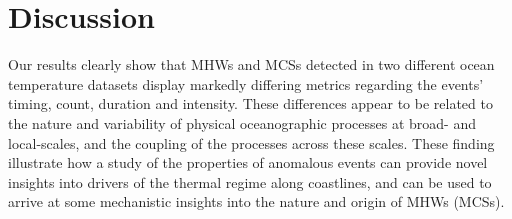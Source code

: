 \documentclass[a4paper,10pt,review]{elsarticle}
\begin{document}
\section{Discussion}
Our results clearly show that MHWs and MCSs detected in two different ocean temperature datasets display markedly differing metrics regarding the events' timing, count, duration and intensity. These differences appear to be related to the nature and variability of physical oceanographic processes at broad- and local-scales, and the coupling of the processes across these scales. These finding illustrate how a study of the properties of anomalous events can provide novel insights into drivers of the thermal regime along coastlines, and can be used to arrive at some mechanistic insights into the nature and origin of MHWs (MCSs). %
\end{document}
